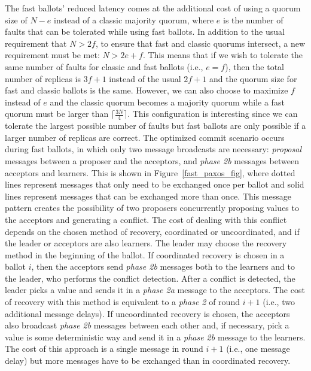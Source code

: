 The fast ballots' reduced latency comes at the additional cost of using a quorum size of $N-e$ instead of a classic majority quorum, where $e$ is the number of faults that can be tolerated while using fast ballots. In addition to the usual requirement that $N> 2f$, to ensure that fast and classic quorums intersect, a new requirement must be met: $N > 2e+f$. This means that if we wish to tolerate the same number of faults for classic and fast ballots (i.e., $e=f$), then the total number of replicas is $3f+1$ instead of the usual $2f+1$ and the quorum size for fast and classic ballots is the same. However, we can also choose to maximize $f$ instead of $e$ and the classic quorum becomes a majority quorum while a fast quorum must be larger than $\lceil \frac{3N}{4} \rceil$. This configuration is interesting since we can tolerate the largest possible number of faults but fast ballots are only possible if a larger number of replicas are correct. The optimized commit scenario occurs during fast ballots, in which only two message broadcasts are necessary: \textit{proposal} messages between a proposer and the acceptors, and \textit{phase 2b} messages between acceptors and learners. This is shown in Figure~\ref{fast_paxos_fig}, where dotted lines represent messages that only need to be exchanged once per ballot and solid lines represent messages that can be exchanged more than once. This message pattern creates the possibility of two proposers concurrently proposing values to the acceptors and generating a conflict. The cost of dealing with this conflict depends on the chosen method of recovery, coordinated or uncoordinated, and if the leader or acceptors are also learners. The leader may choose  the recovery method in the beginning of the ballot. If coordinated recovery is chosen in a ballot $i$, then the acceptors send \textit{phase 2b} messages both to the learners and to the leader, who performs the conflict detection. After a conflict is detected, the leader picks a value and sends it in a \textit{phase 2a} message to the acceptors. The cost of recovery with this method is equivalent to a \textit{phase 2} of round $i+1$ (i.e., two additional message delays). If uncoordinated recovery is chosen, the acceptors also broadcast \textit{phase 2b} messages between each other and, if necessary, pick a value is some deterministic way and send it in a \textit{phase 2b} message to the learners. The cost of this approach is a single message in round $i+1$ (i.e., one message delay) but more messages have to be exchanged than in coordinated recovery. \par
